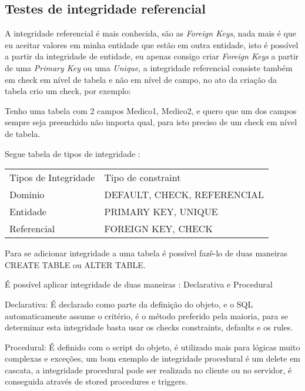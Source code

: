 \subsection{Testes de integridade referencial}
\label{cha:intref}

A integridade referencial é mais conhecida, são as \emph{Foreign Keys}, nada mais é que eu aceitar valores em minha entidade que estão em outra entidade, isto é possível a partir da integridade de entidade, eu apenas consigo criar \emph{Foreign Keys} a partir de uma \emph{Primary Key} ou uma \emph{Unique}, a integridade referencial consiste também em check em nível de tabela e não em nível de campo, no ato da criação da tabela crio um check, por exemplo:

Tenho uma tabela com 2 campos Medico1, Medico2, e quero que um dos campos sempre seja preenchido não importa qual, para isto preciso de um check em nível de tabela.

Segue tabela de tipos de integridade :

\begin{center}
	\begin{tabular}{ll}
		Tipos de Integridade & Tipo de constraint \\
		Dominio & DEFAULT, CHECK, REFERENCIAL \\
		Entidade & PRIMARY KEY, UNIQUE \\
		Referencial & FOREIGN KEY, CHECK \\
	\end{tabular}
	\label{tab:intref}
\end{center}


Para se adicionar integridade a uma tabela é possível fazê-lo de duas maneiras CREATE TABLE ou ALTER TABLE.

É possível aplicar integridade de duas maneiras : Declarativa e Procedural

Declarativa: É declarado como parte da definição do objeto, e o SQL automaticamente assume o critério, é o método preferido pela maioria, para se determinar esta integridade basta usar os checks constraints, defaults e os rules.

Procedural: É definido com o script do objeto, é utilizado mais para lógicas muito complexas e exceções, um bom exemplo de integridade procedural é um delete em cascata, a integridade procedural pode ser realizada no cliente ou no servidor, é conseguida através de stored procedures e triggers.



